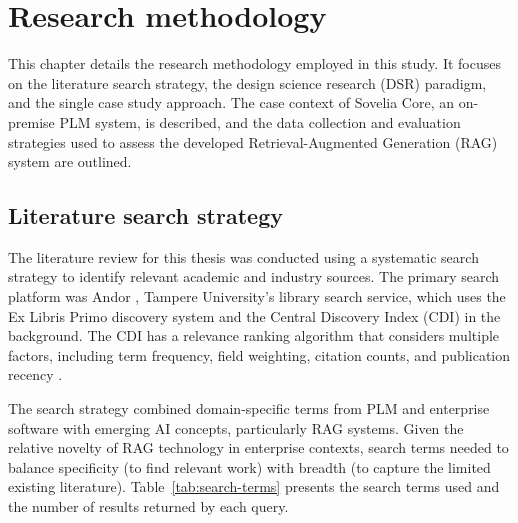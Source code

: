 \chapter{Research methodology}
\label{ch:research-methodology}

This chapter details the research methodology employed in this study. It focuses on the literature search strategy, the design science research (DSR) paradigm, and the single case study approach. The case context of Sovelia Core, an on-premise PLM system, is described, and the data collection and evaluation strategies used to assess the developed Retrieval-Augmented Generation (RAG) system are outlined.

\section{Literature search strategy}
\label{sec:literature-search-strategy}

The literature review for this thesis was conducted using a systematic search strategy to identify relevant academic and industry sources. The primary search platform was Andor \parencite{Andor}, Tampere University's library search service, which uses the Ex Libris Primo discovery system and the Central Discovery Index (CDI) in the background. The CDI has a relevance ranking algorithm that considers multiple factors, including term frequency, field weighting, citation counts, and publication recency \parencite{SearchRankingCDI2020}.

The search strategy combined domain-specific terms from PLM and enterprise software with emerging AI concepts, particularly RAG systems. Given the relative novelty of RAG technology in enterprise contexts, search terms needed to balance specificity (to find relevant work) with breadth (to capture the limited existing literature). Table~\ref{tab:search-terms} presents the search terms used and the number of results returned by each query.

